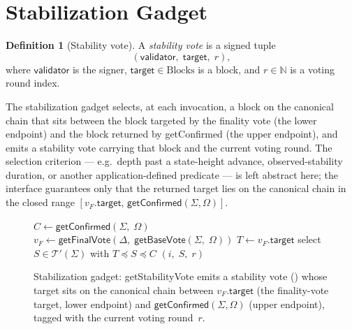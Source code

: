 \ifx\litemode\undefined\documentclass{article}\fi
\newcommand{\target}{\mathsf{target}}
\newcommand{\validator}{\mathsf{validator}}
\newcommand{\viableTree}{\ensuremath{\mathcal{T}'}}
\newcommand{\getBaseVote}{\textsf{getBaseVote}\xspace}
\newcommand{\getFinalVote}{\textsf{getFinalVote}\xspace}
\newcommand{\getStabilityVote}{\textsf{getStabilityVote}\xspace}
\newcommand{\getConfirmed}{\textsf{getConfirmed}\xspace}
\theoremstyle{plain}
\theoremstyle{definition}
\newtheorem{definition}{Definition}
\theoremstyle{remark}
\begin{document}
\section{Stabilization Gadget}\label{sec:stability}

\begin{definition}[Stability vote]\label{def:stability-vote}
A \emph{stability vote} is a signed tuple
\[
  (\validator,\; \target,\; r),
\]
where $\validator$ is the signer, $\target \in \mathrm{Blocks}$ is a block, and $r \in \mathbb{N}$ is a voting round index.
\end{definition}

The stabilization gadget selects, at each invocation, a block on the canonical chain that sits between the block targeted by the finality vote (the lower endpoint) and the block returned by \getConfirmed{} (the upper endpoint), and emits a stability vote carrying that block and the current voting round.
The selection criterion --- e.g.\ depth past a state-height advance, observed-stability duration, or another application-defined predicate --- is left abstract here; the interface guarantees only that the returned target lies on the canonical chain in the closed range $[v_F.\target,\, \getConfirmed(\Sigma, \Omega)]$.

\begin{figure}[H]
\caption{Stabilization gadget: \getStabilityVote{} emits a stability vote () whose target sits on the canonical chain between $v_F.\target$ (the finality-vote target, lower endpoint) and $\getConfirmed(\Sigma, \Omega)$ (upper endpoint), tagged with the current voting round~$r$.}\label{alg:stability}
\begin{center}
\begin{boxedminipage}{\textwidth}
\begin{algorithmic}[1]

\Function{\getStabilityVote}{$\Sigma,\; \Omega,\; \Delta,\; r$} 
  \State $C \gets \getConfirmed(\Sigma,\; \Omega)$ 
  \State $v_F \gets \getFinalVote(\Delta,\; \getBaseVote(\Sigma,\; \Omega))$
  \State $T \gets v_F.\target$ 
  \State select $S \in \viableTree(\Sigma)$ with $T \preceq S \preceq C$ 
  \State \Return $(i,\; S,\; r)$ 
\EndFunction

\end{algorithmic}
\end{boxedminipage}
\end{center}
\end{figure}
\end{document}
